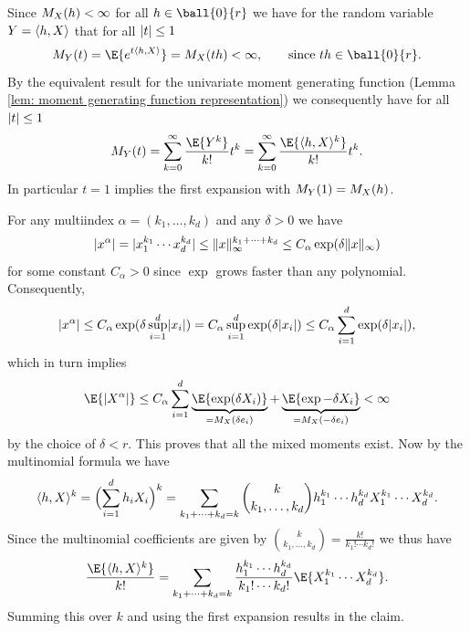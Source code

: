 \begin{solution}
    Since \(M_X(h) < \infty\) for all \(h\in \ball{0}{r}\) we have
    for the random variable \(Y= \langle h, X\rangle\) that for all \(\lvert t\rvert \le 1\)
    \[
        \MGF_Y(t)
        = \E{e^{t\scp{h, X}}}
        = \MGF_X(th)
        < \infty, \qquad \text{since } th \in \ball{0}{r}.
    \]
    By the equivalent result for the univariate moment generating function
    (Lemma \ref{lem: moment generating function representation})
    we consequently have for all \(\lvert t\rvert \le 1\)
    \[
        \MGF_Y(t)
        = \sum_{k=0}^\infty \frac{\E{Y^k}}{k!} t^k
        = \sum_{k=0}^\infty \frac{\E{\scp{h, X}^k}}{k!} t^k.
    \]
    In particular \(t=1\) implies the first expansion with \(M_Y(1) = M_X(h)\).
    
    For any multiindex \(\alpha = (k_1, \dots, k_d)\) and any \(\delta > 0\) we have
    \[
        \lvert x^\alpha\rvert
        = \lvert x_1^{k_1} \cdots x_d^{k_d}\rvert
        \le \lVert x\rVert_\infty^{k_1 + \cdots + k_d}
        \le C_\alpha \exp(\delta \lVert x\rVert_\infty)
    \]
    for some constant \(C_\alpha >0\) since \(\exp\) grows faster than any
    polynomial. Consequently,
    \[
        \lvert x^\alpha\rvert
        \le C_\alpha \exp(\delta \sup_{i=1}^d \lvert x_i\rvert)
        = C_\alpha \sup_{i=1}^d \exp(\delta \lvert x_i\rvert)
        \le C_\alpha \sum_{i=1}^d \exp(\delta \lvert x_i\rvert),
    \]
    which in turn implies
    \[
        \E{\abs{X^\alpha}}
        \le C_\alpha \sum_{i=1}^\dims \underbrace{\E{\exp(\delta X_i)}}_{=\MGF_X(\delta e_i)} + \underbrace{\E{\exp{-\delta X_i}}}_{=\MGF_X(-\delta e_i)}
        < \infty
    \]
    by the choice of \(\delta < r\). This proves that all the mixed moments exist.
    Now by the multinomial formula we have
    \[
        \langle h, X\rangle^k
        = \Bigl(\sum_{i=1}^d h_i X_i\Bigr)^k
        = \sum_{k_1 + \cdots + k_d = k} \binom{k}{k_1, \dots, k_d} h_1^{k_1} \cdots h_d^{k_d} X_1^{k_1} \cdots X_d^{k_d}.
    \]
    Since the multinomial coefficients are given by \(\binom{k}{k_1, \dots, k_d} = \frac{k!}{k_1! \cdots k_d!}\) we thus have
    \[
        \frac{\E{\scp{h, X}^k}}{k!}
        = \sum_{k_1 + \cdots + k_d = k} \frac{h_1^{k_1} \cdots h_d^{k_d}}{k_1! \cdots k_d!} \E{X_1^{k_1} \cdots X_d^{k_d}}.
    \]
    Summing this over \(k\) and using the first expansion results in the claim.
\end{solution}
